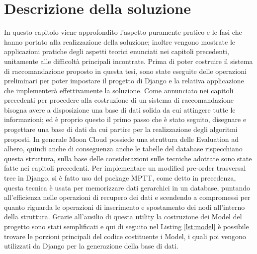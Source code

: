\chapter{Descrizione della soluzione}\label{chp:04-solution}
In questo capitolo viene approfondito l'aspetto puramente pratico e le fasi che hanno portato alla realizzazione della soluzione; 
inoltre vengono mostrate le applicazioni pratiche degli aspetti teorici enunciati nei capitoli precedenti, unitamente alle difficoltà 
principali incontrate.
\vspace{1.5cm}
\hfill\break
Prima di poter costruire il sistema di raccomandazione proposto in questa tesi, sono state eseguite delle operazioni preliminari 
per poter impostare il progetto di Django e la relativa applicazione che implementerà effettivamente la soluzione.
%
Come annunciato nei capitoli precedenti per procedere alla costruzione di un sistema di raccomandazione bisogna avere a disposizione 
una base di dati solida da cui attingere tutte le informazioni; ed è proprio questo il primo passo che è stato seguito, disegnare 
e progettare una base di dati da cui partire per la realizzazione degli algoritmi proposti.
In generale Moon Cloud possiede una struttura delle Evaluation ad albero, quindi anche di conseguenza anche le tabelle del database 
rispecchiano questa struttura, sulla base delle considerazioni sulle tecniche adottate sono state fatte nei capitoli precedenti.\hfill\break
Per implementare un modified pre-order trasversal tree in Django, si è fatto uso del package MPTT, come detto in precedenza, questa 
tecnica è usata per memorizzare dati gerarchici in un database, puntando all'efficienza nelle operazioni di recupero dei dati e 
scendendo a compromessi per quanto riguarda le operazioni di inserimento e spostamento dei nodi all'interno della struttura.
Grazie all'ausilio di questa utility la costruzione dei Model del progetto sono stati semplificati e qui di seguito nel Listing \ref{lst:model} 
è possibile trovare le porzioni principali del codice costituente i Model, i quali poi vengono utilizzati da Django per la 
generazione della base di dati.
%
\lstset{style=python_code_style}
